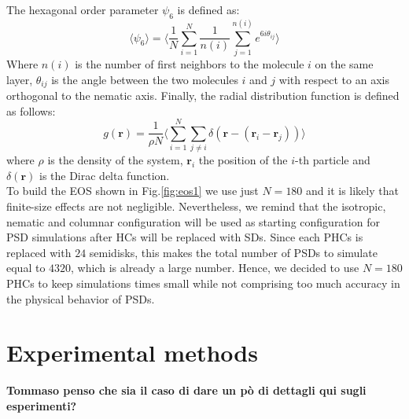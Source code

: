\documentclass[aip,jcp, amsmath, amssymb, reprint]{revtex4-1}
\begin{document}
The hexagonal order parameter $\psi_6$ is defined as:
\begin{equation}  
\label{esa}
\langle \psi_6\rangle=\bigg\langle \frac{1}{N} \sum_{i=1}^N \frac{1}{n(i)} \sum_{j=1}^{n(i)}e^{6i\theta_{ij}} \bigg\rangle
\end{equation}
Where $n(i)$ is the number of first neighbors to the molecule $i$ on the same layer, $\theta_{ij}$ is the angle between the two molecules $i$ and $j$ with respect to an axis orthogonal to the nematic axis. Finally, the radial distribution function is defined as follows:
\begin{equation}
	g(\textbf{r})=\frac{1}{\rho N} \biggl \langle \sum^N_{i=1} \sum_{j\neq i} \delta ( \mathbf{r} - (\textbf{r}_i-\textbf{r}_j))\biggl \rangle
\end{equation}
where $\rho$ is the density of the system,  $\mathbf{r}_i$ the position of the $i$-th particle and $ \delta(\mathbf{r})$ is the Dirac delta function.\\ 

To build the EOS shown in Fig.\ref{fig:eos1} 
we use just $N=180$ and it is likely that finite-size effects are not negligible. Nevertheless, we remind
that the isotropic, nematic and columnar configuration will be used as starting configuration for PSD
simulations after HCs will be replaced with SDs.
Since each PHCs is replaced with $24$ semidisks, this makes the total number of PSDs to simulate equal to
$4320$, which is already a large number.
Hence, we decided to use $N=180$ PHCs to keep simulations times small while not comprising too much 
accuracy in the physical behavior of PSDs.

\section{\label{exp}Experimental methods}

{\bf \color{red} Tommaso penso che sia il caso di dare un pò di dettagli qui sugli esperimenti?}
\end{document}
